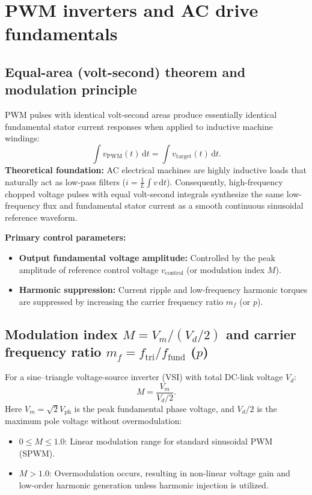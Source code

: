 \section{PWM inverters and AC drive fundamentals}

\subsection{Equal-area (volt-second) theorem and modulation principle}
PWM pulses with identical volt-second areas produce essentially identical fundamental stator current responses when applied to inductive machine windings:
\[
\int v_{\mathrm{PWM}}(t)\,\mathrm{d}t = \int v_{\mathrm{target}}(t)\,\mathrm{d}t.
\]
\textbf{Theoretical foundation:}
AC electrical machines are highly inductive loads that naturally act as low-pass filters (\(i = \frac{1}{L}\int v\,\mathrm{d}t\)). Consequently, high-frequency chopped voltage pulses with equal volt-second integrals synthesize the same low-frequency flux and fundamental stator current as a smooth continuous sinusoidal reference waveform.

\textbf{Primary control parameters:}
\begin{itemize}
  \item \textbf{Output fundamental voltage amplitude:} Controlled by the peak amplitude of reference control voltage \(v_{\mathrm{control}}\) (or modulation index \(M\)).
  \item \textbf{Harmonic suppression:} Current ripple and low-frequency harmonic torques are suppressed by increasing the carrier frequency ratio \(m_f\) (or \(p\)).
\end{itemize}

\subsection{Modulation index \texorpdfstring{$M = V_m / (V_d/2)$}{M = V_m / (V_d/2)} and carrier frequency ratio \texorpdfstring{$m_f = f_{\mathrm{tri}} / f_{\mathrm{fund}}$}{m_f = f_tri / f_fund} (\texorpdfstring{$p$}{p})}
For a sine--triangle voltage-source inverter (VSI) with total DC-link voltage \(V_d\):
\[
M = \frac{V_m}{V_d/2}.
\]
Here \(V_m = \sqrt{2} V_{\mathrm{ph}}\) is the peak fundamental phase voltage, and \(V_d/2\) is the maximum pole voltage without overmodulation:
\begin{itemize}
  \item \(0 \le M \le 1.0\): Linear modulation range for standard sinusoidal PWM (SPWM).
  \item \(M > 1.0\): Overmodulation occurs, resulting in non-linear voltage gain and low-order harmonic generation unless harmonic injection is utilized.
\end{itemize}


